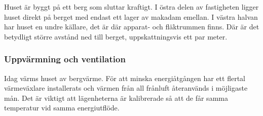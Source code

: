 Huset är byggt på ett berg som sluttar kraftigt. I östra delen av fastigheten ligger huset direkt på berget med endast ett lager av makadam emellan\cite{petersarneo}. I västra halvan har huset en undre källare, det är där apparat- och fläktrummen finns. Där är det betydligt större avstånd ned till berget, uppskattningsvis ett par meter. %

\subsubsection{Uppvärmning och ventilation}
Idag värms huset av bergvärme. För att minska energiåtgången har ett flertal värmeväxlare installerats och värmen från all frånluft återanvänds i möjligaste mån.
Det är viktigt att lägenheterna är kalibrerade så att de får samma temperatur vid samma energiutflöde.


